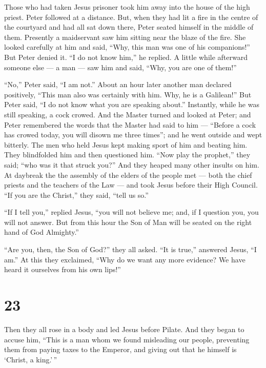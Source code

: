  Those who had taken Jesus prisoner took him away into the
house of the high priest. Peter followed at a distance. 
But, when they had lit a fire in the centre of the courtyard and had all
sat down there, Peter seated himself in the middle of them.
 Presently a maidservant saw him sitting near the blaze of
the fire. She looked carefully at him and said, ``Why, this man was one
of his companions!''  But Peter denied it. ``I do not know
him,'' he replied.  A little while afterward someone else
--- a man --- saw him and said, ``Why, you are one of them!''

``No,'' Peter said, ``I am not.''  About an hour later
another man declared positively, ``This man also was certainly with him.
Why, he is a Galilean!''  But Peter said, ``I do not know
what you are speaking about.'' Instantly, while he was still speaking, a
cock crowed.  And the Master turned and looked at Peter;
and Peter remembered the words that the Master had said to him ---
``Before a cock has crowed today, you will disown me three times'';
 and he went outside and wept bitterly.  The
men who held Jesus kept making sport of him and beating him.
 They blindfolded him and then questioned him. ``Now play
the prophet,'' they said; ``who was it that struck you?'' 
And they heaped many other insults on him.  At daybreak the
the assembly of the elders of the people met --- both the chief priests
and the teachers of the Law --- and took Jesus before their High
Council.  ``If you are the Christ,'' they said, ``tell us
so.''

``If I tell you,'' replied Jesus, ``you will not believe me;
 and, if I question you, you will not answer. 
But from this hour the Son of Man will be seated on the right hand of
God Almighty.''

 ``Are you, then, the Son of God?'' they all asked. ``It is
true,'' answered Jesus, ``I am.''  At this they exclaimed,
``Why do we want any more evidence? We have heard it ourselves from his
own lips!''

\hypertarget{section-21}{%
\section{23}\label{section-21}}

 Then they all rose in a body and led Jesus before Pilate.
 And they began to accuse him, ``This is a man whom we found
misleading our people, preventing them from paying taxes to the Emperor,
and giving out that he himself is `Christ, a king.'\,''

